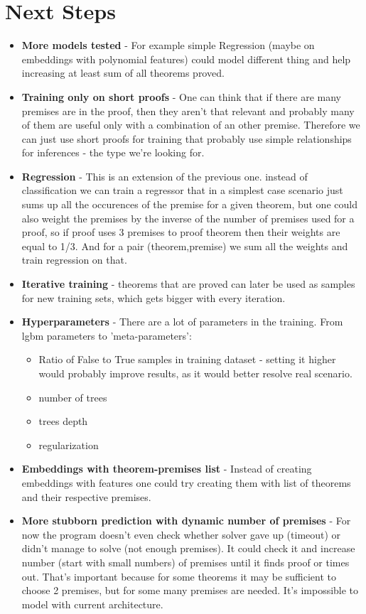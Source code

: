 \documentclass{article} %
\begin{document}
\section{Next Steps}
\begin{itemize}
\item \textbf{More models tested} - For example simple Regression (maybe on embeddings with polynomial features) could model different thing and help increasing at least sum of all theorems proved. 
\item \textbf{Training only on short proofs} - One can think that if there are many premises are in the proof, then they aren't that relevant and probably many of them are useful only with a combination of an other premise. Therefore we can just use short proofs for training that probably use simple relationships for inferences - the type we're looking for.
\item \textbf{Regression} - This is an extension of the previous one. instead of classification we can train a regressor that in a simplest case scenario just sums up all the occurences of the premise for a given theorem, but one could also weight the premises by the inverse of the number of premises used for a proof, so if proof uses 3 premises to proof theorem then their weights are equal to 1/3. And for a pair (theorem,premise) we sum all the weights and train regression on that.
\item \textbf{Iterative training} - theorems that are proved can later be used as samples for new training sets, which gets bigger with every iteration.
\item \textbf{Hyperparameters} - There are a lot of parameters in the training. From lgbm parameters to 'meta-parameters': \begin{itemize}
	\item Ratio of False to True samples in training dataset - setting it higher would probably improve results, as it would better resolve real scenario.
	\item number of trees
	\item trees depth
	\item regularization
	\end{itemize}
\item \textbf{Embeddings with theorem-premises list} - Instead of creating embeddings with features one could try creating them with list of theorems and their respective premises.
\item \textbf{More stubborn prediction with dynamic number of premises} - For now the program doesn't even check whether solver gave up (timeout) or didn't manage to solve (not enough premises). It could check it and increase number (start with small numbers) of premises until it finds proof or times out. That's important because for some theorems it may be sufficient to choose 2 premises, but for some many premises are needed. It's impossible to model with current architecture.

\end{itemize}
\end{document}
